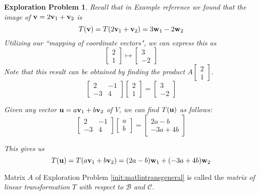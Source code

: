 \documentclass{ximera}
\renewcommand{\vec}[1]{{\bf #1}}
\newcommand{\dfn}{\textit}
\newtheorem{initprob}{Exploration Problem}
\begin{document}
\begin{initprob}
Recall that in Example {\color{red} reference} we found that the image of $\vec{v}=2\vec{v}_1+\vec{v}_2$ is $$T(\vec{v})=T(2\vec{v}_1+\vec{v}_2)=3\vec{w}_1-2\vec{w}_2$$
Utilizing our ``mapping of coordinate vectors", we can express this as 
$$\begin{bmatrix}2\\1\end{bmatrix}\mapsto\begin{bmatrix}3\\-2\end{bmatrix}$$
Note that this result can be obtained by finding the product $A\begin{bmatrix}2\\1\end{bmatrix}$.
$$\begin{bmatrix}2&-1\\-3&4\end{bmatrix}\begin{bmatrix}2\\1\end{bmatrix}=\begin{bmatrix}3\\-2\end{bmatrix}$$

Given any vector $\vec{u}=a\vec{v}_1+b\vec{v}_2$ of $V$, we can find $T(\vec{u})$ as follows:
$$\begin{bmatrix}2&-1\\-3&4\end{bmatrix}\begin{bmatrix}a\\b\end{bmatrix}=\begin{bmatrix}2a-b\\-3a+4b\end{bmatrix}$$

This gives us
$$T(\vec{u})=T(a\vec{v}_1+b\vec{v}_2)=(2a-b)\vec{w}_1+(-3a+4b)\vec{w}_2$$

\end{initprob}

Matrix $A$ of Exploration Problem \ref{init:matlintransgeneral} is called the \dfn{matrix of linear transformation $T$ with respect to $\mathcal{B}$ and $\mathcal{C}$}.
\end{document}
